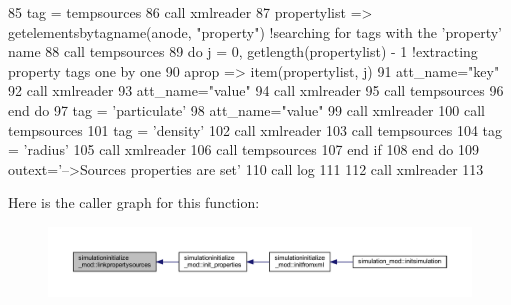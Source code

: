 \begin{DoxyCode}
85             tag = tempsources%
86             \textcolor{keyword}{call }xmlreader%
87             propertylist => getelementsbytagname(anode, \textcolor{stringliteral}{"property"})        \textcolor{comment}{!searching for tags with the
       'property' name}
88             \textcolor{keyword}{call }tempsources%
89             \textcolor{keywordflow}{do} j = 0, getlength(propertylist) - 1                          \textcolor{comment}{!extracting property tags one by
       one}
90                 aprop => item(propertylist, j)
91                 att\_name=\textcolor{stringliteral}{"key"}
92                 \textcolor{keyword}{call }xmlreader%
93                 att\_name=\textcolor{stringliteral}{"value"}
94                 \textcolor{keyword}{call }xmlreader%
95                 \textcolor{keyword}{call }tempsources%
96 \textcolor{keywordflow}{            end do}
97             tag = \textcolor{stringliteral}{'particulate'}
98             att\_name=\textcolor{stringliteral}{"value"}
99             \textcolor{keyword}{call }xmlreader%
100             \textcolor{keyword}{call }tempsources%
101             tag = \textcolor{stringliteral}{'density'}
102             \textcolor{keyword}{call }xmlreader%
103             \textcolor{keyword}{call }tempsources%
104             tag = \textcolor{stringliteral}{'radius'}
105             \textcolor{keyword}{call }xmlreader%
106             \textcolor{keyword}{call }tempsources%
107 \textcolor{keywordflow}{        end if}
108 \textcolor{keywordflow}{    end do}
109     outext=\textcolor{stringliteral}{'-->Sources properties are set'}
110     \textcolor{keyword}{call }log%
111 
112     \textcolor{keyword}{call }xmlreader%
113 
\end{DoxyCode}
Here is the caller graph for this function\+:\nopagebreak
\begin{figure}[H]
\begin{center}
\leavevmode
\includegraphics[width=350pt]{namespacesimulationinitialize__mod_aa4c1099b84c9901ab1286a3796a54f71_icgraph}
\end{center}
\end{figure}
